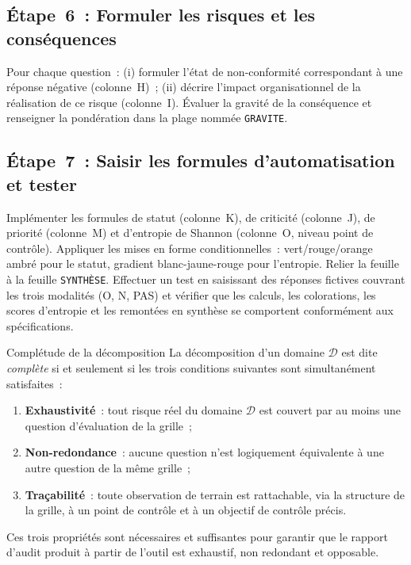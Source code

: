 \subsection{Étape~6~: Formuler les risques et les conséquences}

Pour chaque question~: (i) formuler l'état de non-conformité correspondant à une
réponse négative (colonne~H)~; (ii) décrire l'impact organisationnel de la
réalisation de ce risque (colonne~I). Évaluer la gravité de la conséquence et
renseigner la pondération dans la plage nommée \texttt{GRAVITE}.

\subsection{Étape~7~: Saisir les formules d'automatisation et tester}

Implémenter les formules de statut (colonne~K), de criticité (colonne~J),
de priorité (colonne~M) et d'entropie de Shannon (colonne~O, niveau point de
contrôle). Appliquer les mises en forme conditionnelles~: vert/rouge/orange
ambré pour le statut, gradient blanc-jaune-rouge pour l'entropie. Relier la
feuille à la feuille \texttt{SYNTHÈSE}. Effectuer un test en saisissant des
réponses fictives couvrant les trois modalités (O, N, PAS) et vérifier que les
calculs, les colorations, les scores d'entropie et les remontées en synthèse se
comportent conformément aux spécifications.

\begin{boiteTheoreme}{Complétude de la décomposition}
La décomposition d'un domaine $\mathcal{D}$ est dite \emph{complète} si et
seulement si les trois conditions suivantes sont simultanément satisfaites~:

\begin{enumerate}
  \item \textbf{Exhaustivité}~: tout risque réel du domaine $\mathcal{D}$ est
        couvert par au moins une question d'évaluation de la grille~;
  \item \textbf{Non-redondance}~: aucune question n'est logiquement équivalente
        à une autre question de la même grille~;
  \item \textbf{Traçabilité}~: toute observation de terrain est rattachable,
        via la structure de la grille, à un point de contrôle et à un objectif
        de contrôle précis.
\end{enumerate}

Ces trois propriétés sont nécessaires et suffisantes pour garantir que le
rapport d'audit produit à partir de l'outil est exhaustif, non redondant et
opposable.
\end{boiteTheoreme}
